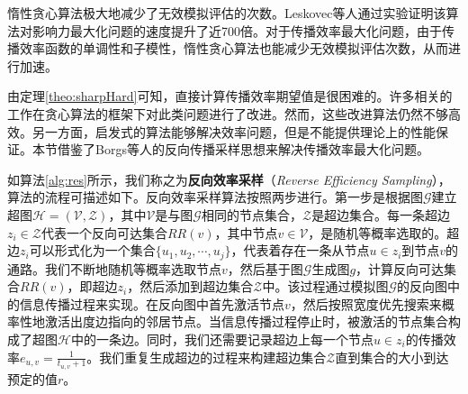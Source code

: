 惰性贪心算法极大地减少了无效模拟评估的次数。Leskovec等人通过实验证明该算法对影响力最大化问题的速度提升了近700倍。对于传播效率最大化问题，由于传播效率函数的单调性和子模性，惰性贪心算法也能减少无效模拟评估次数，从而进行加速。

由定理\ref{theo:sharpHard}可知，直接计算传播效率期望值是很困难的。许多相关的工作在贪心算法的框架下对此类问题进行了改进。然而，这些改进算法仍然不够高效。另一方面，启发式的算法能够解决效率问题，但是不能提供理论上的性能保证。本节借鉴了Borgs等人的反向传播采样思想来解决传播效率最大化问题。

\begin{algorithm}[!ht]
    \caption{$RES$($k$,$r$,$T'\left(\cdot\right)$)}
    \label{alg:res}
    \begin{algorithmic}[1]
    \ENDFOR
    \ENDFOR
    \end{algorithmic}
\end{algorithm}

如算法\ref{alg:res}所示，我们称之为\textbf{反向效率采样}（\textit{Reverse Efficiency Sampling}），算法的流程可描述如下。反向效率采样算法按照两步进行。第一步是根据图$\mathcal{G}$建立超图$\mathcal{H}=\left(\mathcal{V}, \mathcal{Z} \right)$，其中$\mathcal{V}$是与图$\mathcal{G}$相同的节点集合，$\mathcal{Z}$是超边集合。每一条超边$z_i \in \mathcal{Z}$代表一个反向可达集合$RR\left(v\right)$，其中节点$v \in \mathcal{V}$，是随机等概率选取的。超边$z_i$可以形式化为一个集合$\{u_1, u_2, \cdots, u_j\}$，代表着存在一条从节点$u \in z_i$到节点$v$的通路。我们不断地随机等概率选取节点$v$，然后基于图$\mathcal{G}$生成图$g$，计算反向可达集合$RR\left(v\right)$，即超边$z_i$，然后添加到超边集合$\mathcal{Z}$中。该过程通过模拟图$\mathcal{G}$的反向图中的信息传播过程来实现。在反向图中首先激活节点$v$，然后按照宽度优先搜索来概率性地激活出度边指向的邻居节点。当信息传播过程停止时，被激活的节点集合构成了超图$\mathcal{H}$中的一条边。同时，我们还需要记录超边上每一个节点$u \in z_i$的传播效率$e_{u,v} = \frac{1}{t_{u,v}+1}$。我们重复生成超边的过程来构建超边集合$\mathcal{Z}$直到集合的大小到达预定的值$r$。

